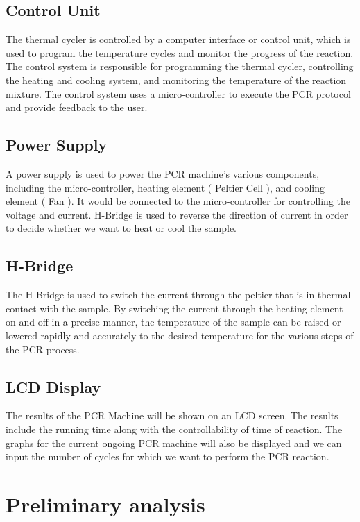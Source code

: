 \documentclass{article}
\begin{document}
\subsection{Control Unit}
The thermal cycler is controlled by a computer interface or control unit, which is used to program the temperature cycles and monitor the progress of the reaction. The control system is responsible for programming the thermal cycler, controlling the heating and cooling system, and monitoring the temperature of the reaction mixture. The control system uses a micro-controller to execute the PCR protocol and provide feedback to the user.

\subsection{Power Supply}
A power supply is used to power the PCR machine's various components, including the micro-controller, heating element ( Peltier Cell ), and cooling element ( Fan ). It would be connected to the micro-controller for controlling the voltage and current. H-Bridge is used to reverse the direction of current in order to decide whether we want to heat or cool the sample.

\subsection{H-Bridge}
The H-Bridge is used to switch the current through the peltier that is in thermal contact with the sample. By switching the current through the heating element on and off in a precise manner, the temperature of the sample can be raised or lowered rapidly and accurately to the desired temperature for the various steps of the PCR process.


\subsection{LCD Display}
The results of the PCR Machine will be shown on an LCD screen. The results include the running time along with the controllability of time of reaction. The graphs for the current ongoing PCR machine will also be displayed and we can input the number of cycles for which we want to perform the PCR reaction.


\maketitle


\section{ Preliminary analysis }
\end{document}

